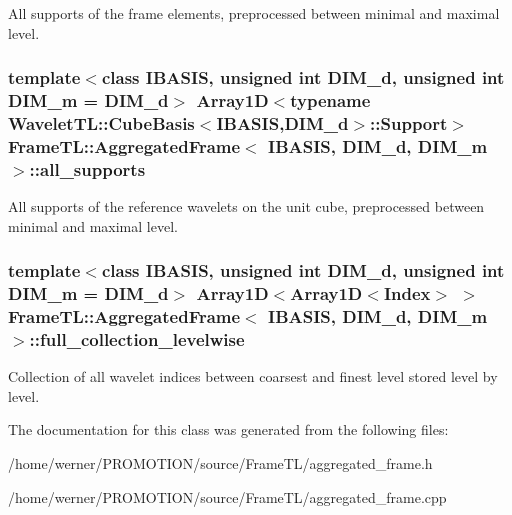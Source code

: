 All supports of the frame elements, preprocessed between minimal and maximal level. \hypertarget{classFrameTL_1_1AggregatedFrame_79046c4fc86d939e165aa11a5c7d9f9a}{
\subsubsection[{all\_\-supports}]{\setlength{\rightskip}{0pt plus 5cm}template$<$class IBASIS, unsigned int DIM\_\-d, unsigned int DIM\_\-m = DIM\_\-d$>$ Array1D$<$typename WaveletTL::CubeBasis$<$IBASIS,DIM\_\-d$>$::{\bf Support}$>$ {\bf FrameTL::AggregatedFrame}$<$ IBASIS, DIM\_\-d, DIM\_\-m $>$::{\bf all\_\-supports}}}
\label{classFrameTL_1_1AggregatedFrame_79046c4fc86d939e165aa11a5c7d9f9a}


All supports of the reference wavelets on the unit cube, preprocessed between minimal and maximal level. \hypertarget{classFrameTL_1_1AggregatedFrame_71d04f538cfd359189ed4898712c54b0}{
\subsubsection[{full\_\-collection\_\-levelwise}]{\setlength{\rightskip}{0pt plus 5cm}template$<$class IBASIS, unsigned int DIM\_\-d, unsigned int DIM\_\-m = DIM\_\-d$>$ Array1D$<$Array1D$<${\bf Index}$>$ $>$ {\bf FrameTL::AggregatedFrame}$<$ IBASIS, DIM\_\-d, DIM\_\-m $>$::{\bf full\_\-collection\_\-levelwise}}}
\label{classFrameTL_1_1AggregatedFrame_71d04f538cfd359189ed4898712c54b0}


Collection of all wavelet indices between coarsest and finest level stored level by level. 

The documentation for this class was generated from the following files:\begin{CompactItemize}
\item 
/home/werner/PROMOTION/source/FrameTL/aggregated\_\-frame.h\item 
/home/werner/PROMOTION/source/FrameTL/aggregated\_\-frame.cpp\end{CompactItemize}
